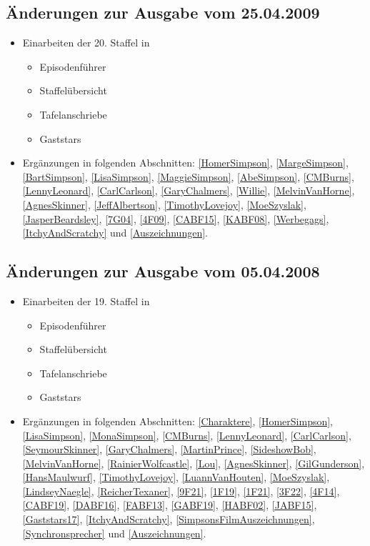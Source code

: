 \documentclass[pagesize,twoside,german]{scrbook}
\begin{document}
\subsection*{Änderungen zur Ausgabe vom 25.04.2009}
\begin{itemize}
  \item Einarbeiten der 20. Staffel in
	\begin{itemize}
		\item Episodenführer
		\item Staffelübersicht
		\item Tafelanschriebe
		\item Gaststars
	\end{itemize}
	\item Ergänzungen in folgenden Abschnitten: \ref{HomerSimpson}, \ref{MargeSimpson}, \ref{BartSimpson}, \ref{LisaSimpson}, \ref{MaggieSimpson}, \ref{AbeSimpson}, \ref{CMBurns}, \ref{LennyLeonard}, \ref{CarlCarlson}, \ref{GaryChalmers}, \ref{Willie}, \ref{MelvinVanHorne}, \ref{AgnesSkinner}, \ref{JeffAlbertson}, \ref{TimothyLovejoy}, \ref{MoeSzyslak}, \ref{JasperBeardsley}, \ref{7G04}, \ref{4F09}, \ref{CABF15}, \ref{KABF08}, \ref{Werbegags}, \ref{ItchyAndScratchy} und \ref{Auszeichnungen}.
\end{itemize}


\subsection*{Änderungen zur Ausgabe vom 05.04.2008}
\begin{itemize}
  \item Einarbeiten der 19. Staffel in
	\begin{itemize}
		\item Episodenführer
		\item Staffelübersicht
		\item Tafelanschriebe
		\item Gaststars
	\end{itemize}
	\item Ergänzungen in folgenden Abschnitten: \ref{Charaktere}, \ref{HomerSimpson}, \ref{LisaSimpson}, \ref{MonaSimpson}, \ref{CMBurns}, \ref{LennyLeonard},  \ref{CarlCarlson}, \ref{SeymourSkinner}, \ref{GaryChalmers}, \ref{MartinPrince}, \ref{SideshowBob}, \ref{MelvinVanHorne}, \ref{RainierWolfcastle}, \ref{Lou}, \ref{AgnesSkinner}, \ref{GilGunderson}, \ref{HansMaulwurf}, \ref{TimothyLovejoy}, \ref{LuannVanHouten}, \ref{MoeSzyslak}, \ref{LindseyNaegle}, \ref{ReicherTexaner}, \ref{9F21}, \ref{1F19}, \ref{1F21}, \ref{3F22}, \ref{4F14}, \ref{CABF19}, \ref{DABF16}, \ref{FABF13}, \ref{GABF19}, \ref{HABF02}, \ref{JABF15}, \ref{Gaststars17}, \ref{ItchyAndScratchy}, \ref{SimpsonsFilmAuszeichnungen}, \ref{Synchronsprecher} und \ref{Auszeichnungen}.
\end{itemize}
\end{document}
